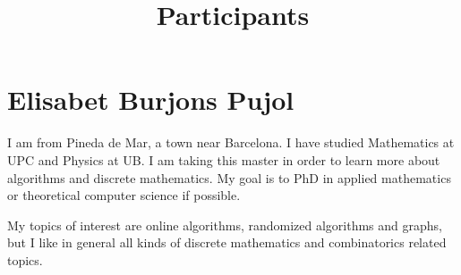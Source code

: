 \documentclass[a4paper,12pt]{article} %
\title{Participants}
\begin{document}
\maketitle

\section{Elisabet Burjons Pujol}

I am from Pineda de Mar, a town near Barcelona. I have studied Mathematics at UPC and Physics at UB. 
I am taking this master in order to learn more about algorithms and discrete mathematics.
My goal is to PhD in applied mathematics or theoretical computer science if possible.

My topics of interest are online algorithms, randomized algorithms and graphs,
but I like in general all kinds of discrete mathematics and combinatorics related topics.
\end{document}
